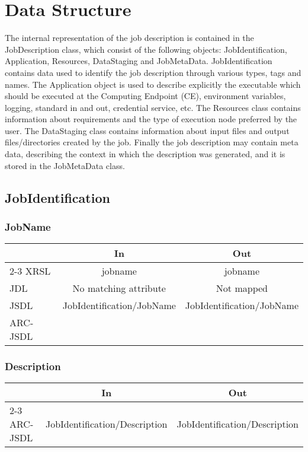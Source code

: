 \documentclass{article}
\newenvironment{inouttabular}%
{\begin{center}\begin{tabular}{l>{\ttfamily\footnotesize}c>{\ttfamily\footnotesize}c}%
\toprule
& \textnormal{\normalsize{In}} & \textnormal{\normalsize{Out}}\\ \cmidrule{2-3}}
{\bottomrule\end{tabular}\end{center}}
\begin{document}
\section{Data Structure}
The internal representation of the job description is contained in the
JobDescription class, which consist of the following objects:
JobIdentification, Application, Resources, DataStaging and JobMetaData.
JobIdentification contains data used to identify the job description
through various types, tags and names. The Application object is used
to describe explicitly the executable which should be executed at the
Computing Endpoint (CE), environment variables, logging, standard in
and out, credential service, etc. The Resources class contains
information about requirements and the type of execution node preferred
by the user. The DataStaging class contains information about input
files and output files/directories created by the job. Finally the job
description may contain meta data, describing the context in which the
description was generated, and it is stored in the JobMetaData class.

\subsection{JobIdentification}
\subsubsection{JobName}
\begin{table}[h]
\begin{inouttabular}
XRSL & jobname & jobname\\
JDL & No matching attribute & Not mapped\\
JSDL & JobIdentification/JobName & JobIdentification/JobName\\
ARC-JSDL &  & \\
\end{inouttabular}
\end{table}

\subsubsection{Description}
\begin{table}[h]
\begin{inouttabular}
ARC-JSDL & JobIdentification/Description & JobIdentification/Description\\
\end{inouttabular}
\end{table}
\end{document}
